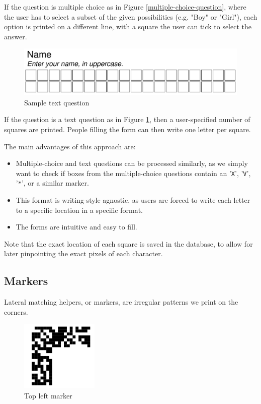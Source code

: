 \documentclass[11pt, a4paper]{report}
\def\code#1{\texttt{#1}}
\begin{document}
If the question is multiple choice as in Figure \ref{multiple-choice-question}, where the user has to select a subset of the given possibilities (e.g. "Boy" or "Girl"), each option is printed on a different line, with a square the user can tick to select the answer.


\begin{figure}[!h]
    \centering
    \includegraphics[width=40em]{images/screenshoots/sample-text-question.png}
    \caption{Sample text question}
    \label{text-question}
\end{figure}

If the question is a text question as in Figure \ref{text-question}, then a user-specified number of squares are printed. People filling the form can then write one letter per square.

The main advantages of this approach are:
\begin{itemize}
    \item Multiple-choice and text questions can be processed similarly, as we simply want to check if boxes from the multiple-choice questions contain an '\code{X}', '\code{V}', '\code{*}', or a similar marker.
    \item This format is writing-style agnostic, as users are forced to write each letter to a specific location in a specific format.
    \item The forms are intuitive and easy to fill.
\end{itemize}

Note that the exact location of each square is saved in the database, to allow for later pinpointing the exact pixels of each character.

\subsection{Markers}

Lateral matching helpers, or markers, are irregular patterns we print on the corners.

\begin{figure}[!h]
    \centering
    \includegraphics[width=10em]{images/screenshoots/top-left-marker.png}
    \caption{Top left marker}
    \label{fig:label2}
\end{figure}
\end{document}
